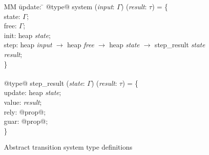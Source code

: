 
\begin{figure}
  \begin{tabbing}
  MM \= update: \= \kill
  @type@ system (\textit{input}: $\Gamma$) (\textit{result}: $\tau$) = \{ \\
  \> state:  \> $\Gamma$; \\
  \> free: \> $\Gamma$; \\
  \> init: \> heap \textit{state}; \\
  \> step: \> heap \textit{input} $\to$ heap \textit{free} $\to$ heap \textit{state} $\to$ step_result \textit{state} \textit{result}; \\
  \} \\
  \\
  @type@ step_result (\textit{state}: $\Gamma$) (\textit{result}: $\tau$) = \{ \\
  \> update:  \> heap \textit{state}; \\
  \> value: \> \textit{result}; \\
  \> rely: \> @prop@; \\
  \> guar: \> @prop@; \\
  \}
  \end{tabbing}
  \caption{Abstract transition system type definitions}
  \label{f:system-types}
\end{figure}
